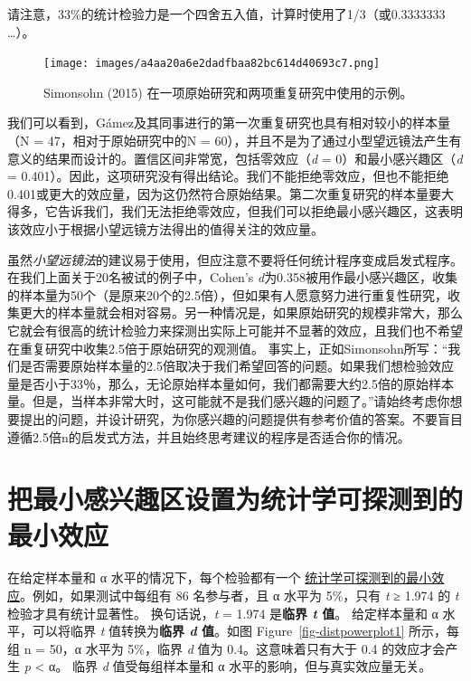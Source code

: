\documentclass[
  letterpaper,
  DIV=11,
  numbers=noendperiod]{scrreprt}
\begin{document}
请注意，33\%的统计检验力是一个四舍五入值，计算时使用了1/3（或0.3333333
\ldots）。

\begin{figure}

{\centering \texttt{[image: images/a4aa20a6e2dadfbaa82bc614d40693c7.png]}

}

\caption{\label{fig-simonsohnexample}Simonsohn (2015)
在一项原始研究和两项重复研究中使用的示例。}

\end{figure}

我们可以看到，Gámez及其同事进行的第一次重复研究也具有相对较小的样本量（N
= 47，相对于原始研究中的N =
60），并且不是为了通过小型望远镜法产生有意义的结果而设计的。置信区间非常宽，包括零效应（\emph{d}
= 0）和最小感兴趣区（\emph{d} =
0.401）。因此，这项研究没有得出结论。我们不能拒绝零效应，但也不能拒绝0.401或更大的效应量，因为这仍然符合原始结果。第二次重复研究的样本量要大得多，它告诉我们，我们无法拒绝零效应，但我们可以拒绝最小感兴趣区，这表明该效应小于根据小望远镜方法得出的值得关注的效应量。

虽然\emph{小望远镜法}的建议易于使用，但应注意不要将任何统计程序变成启发式程序。
在我们上面关于20名被试的例子中，Cohen's
\emph{d}为0.358被用作最小感兴趣区，收集的样本量为50个（是原来20个的2.5倍），但如果有人愿意努力进行重复性研究，收集更大的样本量就会相对容易。另一种情况是，如果原始研究的规模非常大，那么它就会有很高的统计检验力来探测出实际上可能并不显著的效应，且我们也不希望在重复研究中收集2.5倍于原始研究的观测值。
事实上，正如Simonsohn所写：``我们是否需要原始样本量的2.5倍取决于我们希望回答的问题。如果我们想检验效应量是否小于33％，那么，无论原始样本量如何，我们都需要大约2.5倍的原始样本量。但是，当样本非常大时，这可能就不是我们感兴趣的问题了。''请始终考虑你想要提出的问题，并设计研究，为你感兴趣的问题提供有参考价值的答案。不要盲目遵循2.5倍n的启发式方法，并且始终思考建议的程序是否适合你的情况。

\hypertarget{ux628aux6700ux5c0fux611fux5174ux8da3ux533aux8bbeux7f6eux4e3aux7edfux8ba1ux5b66ux53efux63a2ux6d4bux5230ux7684ux6700ux5c0fux6548ux5e94}{%
\section{把最小感兴趣区设置为统计学可探测到的最小效应}\label{ux628aux6700ux5c0fux611fux5174ux8da3ux533aux8bbeux7f6eux4e3aux7edfux8ba1ux5b66ux53efux63a2ux6d4bux5230ux7684ux6700ux5c0fux6548ux5e94}}

在给定样本量和 α 水平的情况下，每个检验都有一个
\protect\hyperlink{minimaldetectable}{统计学可探测到的最小效应}。例如，如果测试中每组有
86 名参与者，且 α 水平为 5\%，只有 \emph{t} ≥ 1.974 的 \emph{t}
检验才具有统计显著性。 换句话说，\emph{t} = 1.974 是\textbf{临界
\emph{t} 值}。 给定样本量和 α 水平，可以将临界 \emph{t}
值转换为\textbf{临界 \emph{d} 值}。如图 Figure~\ref{fig-distpowerplot1}
所示，每组 n = 50，α 水平为 5\%，临界 \emph{d} 值为
0.4。这意味着只有大于 0.4 的效应才会产生 \emph{p} \textless{} α。 临界
\emph{d} 值受每组样本量和 α 水平的影响，但与真实效应量无关。
\end{document}
